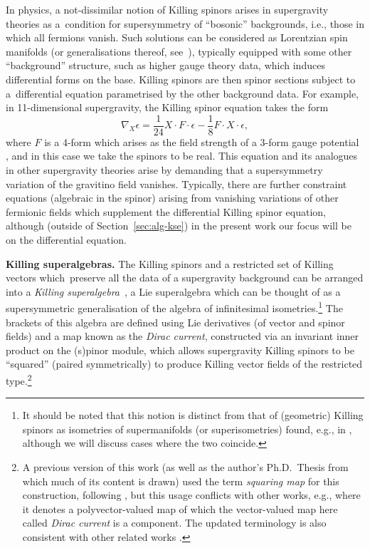 \documentclass[10pt,a4paper]{amsart}
\numberwithin{equation}{section}
\newcommand{\1}{\mathbbm{1}}
\begin{document}
In physics, a not-dissimilar notion of Killing spinors arises in supergravity theories as a~condition for supersymmetry of ``bosonic'' backgrounds, i.e., those in which all fermions vanish. Such solutions can be considered as Lorentzian spin manifolds (or generalisations thereof, see~\cite{Lazaroiu2019,Lazaroiu2019_1}), typically equipped with some other ``background'' structure, such as higher gauge theory data, which induces differential forms on the base. Killing spinors are then spinor sections subject to a~differential equation parametrised by the other background data. For example, in 11-dimensional supergravity, the Killing spinor equation takes the form
\[%
 \nabla_X \epsilon = \frac{1}{24}X \cdot F \cdot \epsilon - \frac{1}{8}F \cdot X \cdot \epsilon,
\]
where $F$ is a 4-form which arises as the field strength of a 3-form gauge potential \cite{Pakis2003}, and in this case we take the spinors to be real. This equation and its analogues in other supergravity theories arise by demanding that a supersymmetry variation of the gravitino field vanishes. Typically, there are further constraint equations (algebraic in the spinor) arising from vanishing variations of other fermionic fields which supplement the differential Killing spinor equation, although (outside of Section~\ref{sec:alg-kse}) in the present work our focus will be on the differential equation.

{\bf Killing superalgebras.}
The Killing spinors and a restricted set of Killing vectors which~preserve all the data of a supergravity background can be arranged into a \emph{Killing superalgebra}~\mbox{\cite{Figueroa-OFarrill2007_1,Figueroa-OFarrill2005}}, a Lie superalgebra which can be thought of as a supersymmetric generalisation of the algebra of infinitesimal isometries.\footnote{It should be noted that this notion is distinct from that of (geometric) Killing spinors as isometries of supermanifolds (or superisometries) found, e.g., in \cite{Alekseevsky1998}, although we will discuss cases where the two coincide.
	}
The brackets of this algebra are defined using Lie derivatives (of vector and spinor fields) and a map known as the \emph{Dirac current}, constructed via an invariant inner product on the (s)pinor module, which allows supergravity Killing spinors to be ``squared'' (paired symmetrically) to produce Killing vector fields of the restricted type.\footnote{A previous version of this work (as well as the author's Ph.D.~Thesis \cite{Beckett2024} from which much of its content is drawn) used the term \emph{squaring map} for this construction, following \cite{Figueroa-OFarrill2012,Figueroa-OFarrill2014,Hustler2016}, but this usage conflicts with other works, e.g., \cite{Cortes2021,Shahbazi2024_1} where it denotes a polyvector-valued map of which the vector-valued map here called \emph{Dirac current} is a component. The updated terminology is also consistent with other related works \cite{Beckett2021,deMedeiros2016,deMedeiros2018,Figueroa-OFarrill2017_1,Figueroa-OFarrill2017}.}
\end{document}
